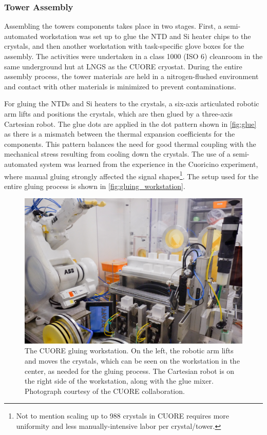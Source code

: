 \subsubsection{Tower Assembly}
\label{ssec:Tower Assembly}
Assembling the towers components takes place in two stages.
First, a semi-automated workstation was set up to glue the NTD and Si heater chips to the crystals, and then another workstation with task-specific glove boxes for the assembly.
The activities were undertaken in a class 1000 (ISO 6) cleanroom in the same underground hut at LNGS as the CUORE cryostat.
During the entire assembly process, the tower materials are held in a nitrogen-flushed environment and contact with other materials is minimized to prevent contaminations.

For gluing the NTDs and Si heaters to the crystals, a six-axis articulated robotic arm lifts and positions the crystals, which are then glued by a three-axis Cartesian robot.
The glue dots are applied in the dot pattern shown in \autoref{fig:glue} as there is a mismatch between the thermal expansion coefficients for the components.
This pattern balances the need for good thermal coupling with the mechanical stress resulting from cooling down the crystals.
The use of a semi-automated system was learned from the experience in the Cuoricino experiment, where manual gluing strongly affected the signal shapes\footnote{Not to mention scaling up to 988 crystals in CUORE requires more uniformity and less manually-intensive labor per crystal/tower.}.
The setup used for the entire gluing process is shown in \autoref{fig:gluing_workstation}.

\begin{figure}[htbp]
    \centering
    \includegraphics[width=0.7\linewidth]{Figures/cuore_gluing_pic1.jpg}
    \caption[The CUORE gluing workstation.]
    {The CUORE gluing workstation.
    On the left, the robotic arm lifts and moves the crystals, which can be seen on the workstation in the center, as needed for the gluing process.
    The Cartesian robot is on the right side of the workstation, along with the glue mixer.
    Photograph courtesy of the CUORE collaboration.}
    \label{fig:gluing_workstation}
\end{figure}

